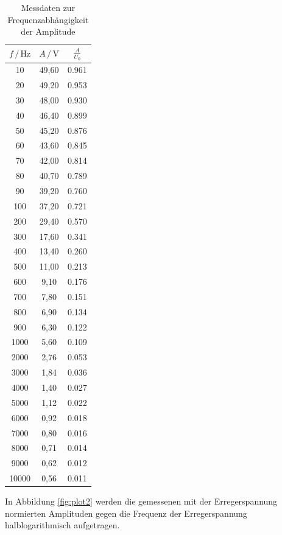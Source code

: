 \begin{table}
\centering
\caption{Messdaten zur Frequenzabhängigkeit der Amplitude}
\label{tab:Messdaten2}
\begin{tabular}{c c c}
\toprule
$f \,/\, \si{\hertz}$ & $A \,/\, \si{\volt}$ & $\frac{A}{U_0}$ \\
\midrule
   10 & 49,60 & 0.961\\
   20 & 49,20 & 0.953\\
   30 & 48,00 & 0.930\\
   40 & 46,40 & 0.899\\
   50 & 45,20 & 0.876\\
   60 & 43,60 & 0.845\\
   70 & 42,00 & 0.814\\
   80 & 40,70 & 0.789\\
   90 & 39,20 & 0.760\\
  100 & 37,20 & 0.721\\
  200 & 29,40 & 0.570\\
  300 & 17,60 & 0.341\\
  400 & 13,40 & 0.260\\
  500 & 11,00 & 0.213\\
  600 &  9,10 & 0.176\\
  700 &  7,80 & 0.151\\
  800 &  6,90 & 0.134\\
  900 &  6,30 & 0.122\\
 1000 &  5,60 & 0.109\\
 2000 &  2,76 & 0.053\\
 3000 &  1,84 & 0.036\\
 4000 &  1,40 & 0.027\\
 5000 &  1,12 & 0.022\\
 6000 &  0,92 & 0.018\\
 7000 &  0,80 & 0.016\\
 8000 &  0,71 & 0.014\\
 9000 &  0,62 & 0.012\\
10000 &  0,56 & 0.011\\
\bottomrule
\end{tabular}
\end{table} 

In Abbildung \ref{fig:plot2} werden die gemessenen mit der Erregerspannung normierten
Amplituden gegen die Frequenz der Erregerspannung halblogarithmisch
aufgetragen. 

